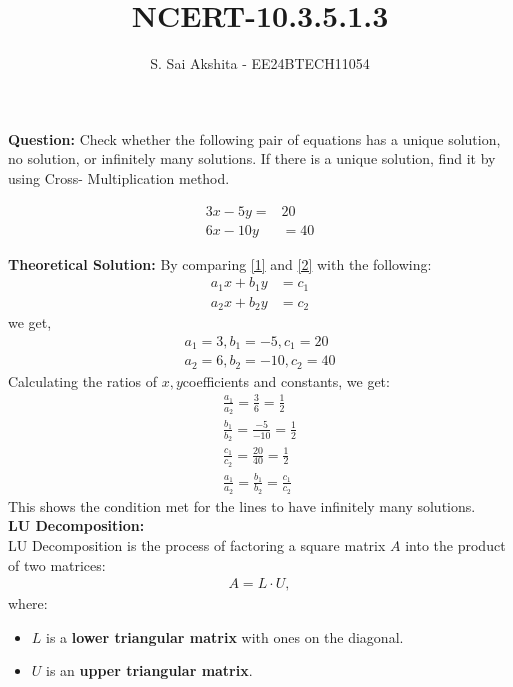 \documentclass[journal,12pt,onecolumn]{IEEEtran}
\theoremstyle{remark}
\begin{document}

\vspace{3cm}

\title{NCERT-10.3.5.1.3}
\author{S. Sai Akshita - EE24BTECH11054}
\newpage
\maketitle
\bigskip

\renewcommand{\thefigure}{\theenumi}
\renewcommand{\thetable}{\theenumi}
\textbf{Question:} Check whether the following pair of equations has a unique solution, no solution, or infinitely many solutions. If there is a unique solution, find it by using Cross- Multiplication method.

\begin{align}
    3x-5y=&20 \label{1}\\
    6x-10y&=40\label{2}
\end{align}

\textbf{Theoretical Solution:}
By comparing \ref{1} and \ref{2} with the following:
\begin{align}
    a_1x + b_1y &= c_1\\
    a_2x + b_2y &= c_2
\end{align}
we get,
\begin{align}
    a_1=3, b_1=-5,c_1=20\\
    a_2=6,b_2=-10,c_2=40
\end{align}
Calculating the ratios of $x,y$coefficients and constants, we get:
\begin{align}
    \frac{a_1}{a_2}=\frac{3}{6}=\frac{1}{2}\\
    \frac{b_1}{b_2}=\frac{-5}{-10}=\frac{1}{2}\\
    \frac{c_1}{c_2}=\frac{20}{40}=\frac{1}{2}\\
    \frac{a_1}{a_2}=\frac{b_1}{b_2}=\frac{c_1}{c_2}
\end{align}
This shows the condition met for the lines to have infinitely many solutions.\\
\textbf{LU Decomposition:}\\
LU Decomposition is the process of factoring a square matrix \( A \) into the product of two matrices:
\begin{align}
A = L \cdot U,
\end{align}
where:
\begin{itemize}
    \item $ L $ is a \textbf{lower triangular matrix} with ones on the diagonal.
    \item $ U $ is an \textbf{upper triangular matrix}.
\end{itemize}
\end{document}
